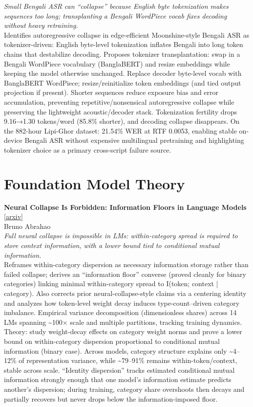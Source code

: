 \documentclass[12pt,letterpaper]{article}
\begin{document}
{\small\textit{Small Bengali ASR can ``collapse'' because English byte tokenization makes sequences too long; transplanting a Bengali WordPiece vocab fixes decoding without heavy retraining.}}\\[1pt]
{\footnotesize Identifies autoregressive collapse in edge-efficient Moonshine-style Bengali ASR as tokenizer-driven: English byte-level tokenization inflates Bengali into long token chains that destabilize decoding. Proposes tokenizer transplantation: swap in a Bengali WordPiece vocabulary (BanglaBERT) and resize embeddings while keeping the model otherwise unchanged. Replace decoder byte-level vocab with BanglaBERT WordPiece; resize/reinitialize token embeddings (and tied output projection if present). Shorter sequences reduce exposure bias and error accumulation, preventing repetitive/nonsensical autoregressive collapse while preserving the lightweight acoustic/decoder stack. Tokenization fertility drops 9.16→1.30 tokens/word (85.8\% shorter), and decoding collapse disappears. On the 882-hour Lipi-Ghor dataset: 21.54\% WER at RTF 0.0053, enabling stable on-device Bengali ASR without expensive multilingual pretraining and highlighting tokenizer choice as a primary cross-script failure source.}

\medskip


\section*{Foundation Model Theory}

{\small\textbf{Neural Collapse Is Forbidden: Information Floors in Language Models}} {\scriptsize[\href{https://arxiv.org/abs/2607.09487}{arxiv}]}\\
{\scriptsize Bruno Abrahao}\\

{\small\textit{Full neural collapse is impossible in LMs: within-category spread is required to store context information, with a lower bound tied to conditional mutual information.}}\\[1pt]
{\footnotesize Reframes within-category dispersion as necessary information storage rather than failed collapse; derives an ``information floor'' converse (proved cleanly for binary categories) linking minimal within-category spread to I(token; context | category). Also corrects prior neural-collapse-style claims via a centering identity and analyzes how token-level weight decay induces type-count--driven category imbalance. Empirical variance decomposition (dimensionless shares) across 14 LMs spanning \textasciitilde{}100× scale and multiple partitions, tracking training dynamics. Theory: study weight-decay effects on category weight norms and prove a lower bound on within-category dispersion proportional to conditional mutual information (binary case). Across models, category structure explains only \textasciitilde{}4--12\% of representation variance, while \textasciitilde{}79--91\% remains within-token/context, stable across scale. ``Identity dispersion'' tracks estimated conditional mutual information strongly enough that one model's information estimate predicts another's dispersion; during training, category share overshoots then decays and partially recovers but never drops below the information-imposed floor.}
\end{document}
